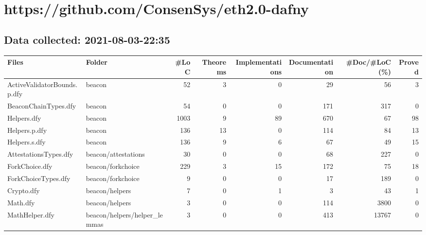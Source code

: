 \documentclass[a4paper, 12pt]{article}
\begin{document}
\section*{https://github.com/ConsenSys/eth2.0-dafny}
\subsection*{Data collected: 2021-08-03-22:35}
\scriptsize
\begin{tabular}{llrrrrrr}
\toprule
                       Files &                        Folder &  \#LoC &  Theorems &  Implementations &  Documentation &  \#Doc/\#LoC (\%) &  Proved \\
\midrule
 ActiveValidatorBounds.p.dfy &                        beacon &    52 &         3 &                0 &             29 &             56 &       3 \\
        BeaconChainTypes.dfy &                        beacon &    54 &         0 &                0 &            171 &            317 &       0 \\
                 Helpers.dfy &                        beacon &  1003 &         9 &               89 &            670 &             67 &      98 \\
               Helpers.p.dfy &                        beacon &   136 &        13 &                0 &            114 &             84 &      13 \\
               Helpers.s.dfy &                        beacon &   136 &         9 &                6 &             67 &             49 &      15 \\
       AttestationsTypes.dfy &           beacon/attestations &    30 &         0 &                0 &             68 &            227 &       0 \\
              ForkChoice.dfy &             beacon/forkchoice &   229 &         3 &               15 &            172 &             75 &      18 \\
         ForkChoiceTypes.dfy &             beacon/forkchoice &     9 &         0 &                0 &             17 &            189 &       0 \\
                  Crypto.dfy &                beacon/helpers &     7 &         0 &                1 &              3 &             43 &       1 \\
                    Math.dfy &                beacon/helpers &     3 &         0 &                0 &            114 &           3800 &       0 \\
              MathHelper.dfy &  beacon/helpers/helper\_lemmas &     3 &         0 &                0 &            413 &          13767 &       0 \\

\end{tabular}
\end{document}

